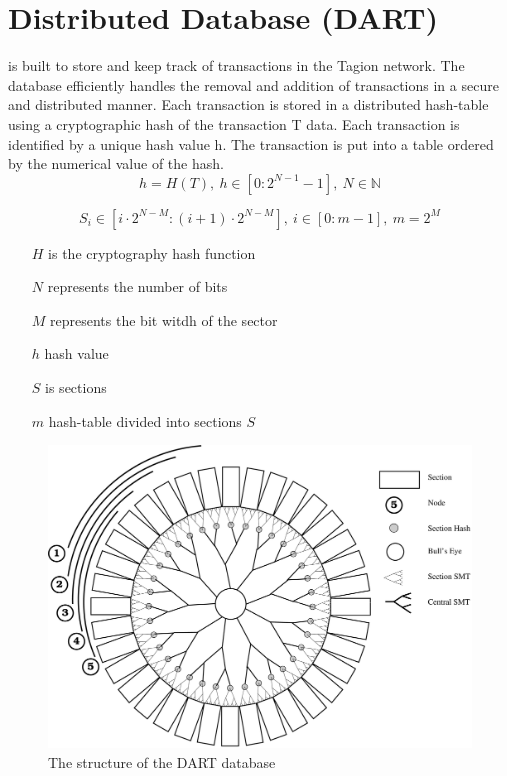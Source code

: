 \section{Distributed Database (DART)}\label{sec:DART}

 is built to store and keep track of transactions in the Tagion network. The database efficiently handles the removal and addition of transactions in a secure and distributed manner.
Each transaction is stored in a distributed hash-table using a cryptographic hash of the transaction T data. Each transaction is identified by a unique hash value h. The transaction is put into a table ordered by the numerical value of the hash.
\begin{equation}
 h = H(T), ~ h \in [0:2^{N-1}-1], ~ N \in \mathbb{N}
\end{equation}

\begin{equation}
  S_i \in [i \cdot 2^{N-M}:(i+1) \cdot 2^{N-M}], ~ i \in [0:m-1], ~ m = 2^M
\end{equation}


\begin{itemize}
 \item[$H$] is the cryptography hash function
 \item[$N$] represents the number of bits
 \item[$M$] represents the bit witdh of the sector
 \item[$h$]  hash value
 \item[$S$]  is sections
 \item[$m$]  hash-table divided into sections $S$
\end{itemize}

\begin{figure}[H]
 \centering
 \includegraphics[width=1.0\textwidth]{fig/dart_bw.eps}
 \caption{The structure of the DART database}
 \label{fig:dart}
\end{figure}


